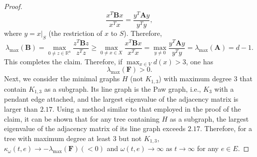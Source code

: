 \documentclass{article}
\begin{document}
\begin{proof}
\[\frac{x^T\mathbf{B} x}{x^T x} = \frac{y^T\mathbf{A} y}{y^T y},\]
where $y = x|_S$ (the restriction of $x$ to $S$). Therefore,
\[\lambda_{\max}(\mathbf{B}) =\max_{0\neq z \in \mathbb{R}^{n}} \frac{z^T\mathbf{B} z}{z^T z} \geq \max_{0\neq x \in X} \frac{x^T\mathbf{B} x}{x^T x} = \max_{y \neq 0} \frac{y^T\mathbf{A} y}{y^T y} = \lambda_{\max}(\mathbf{A}) = d - 1.\]
This completes the claim.
Therefore, if $\max_{x\in V}d(x)> 3$, one has 
\[\lambda_{\max}(\mathbf{F})>0. \]
Next, we consider the minimal graphs $H$ (not $K_{1,3}$) with maximum degree $3$ that contain $K_{1,3}$ as a subgraph. Its line graph is the Paw graph, i.e., $K_3$ with a pendant edge attached, and the largest eigenvalue of the adjacency matrix is larger than $2.17$.
Using a method similar to that employed in the proof of the claim, it can be shown that for any tree containing $H$ as a subgraph, the largest eigenvalue of the adjacency matrix of its line graph exceeds $2.17$. Therefore,   for a tree with maximum degree at least $3$ but not $K_{1,3}$,
$\kappa_{\omega}(t,e)\rightarrow -\lambda_{\max}(\mathbf{F})(<0) $
and
$\omega(t,e)\rightarrow\infty$ as $t\rightarrow \infty$ for any $e\in E$.






\end{proof}
\end{document}
